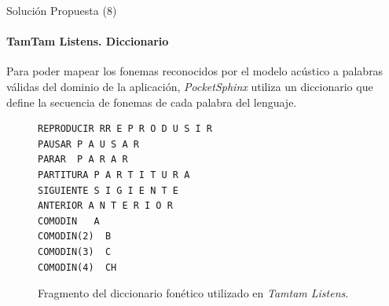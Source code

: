 \begin{frame}[fragile]{Soluci\'on Propuesta (8)}
\framesubtitle{TamTam Listens. Diccionario}
Para poder mapear los fonemas reconocidos por el modelo ac\'ustico a palabras v\'alidas del dominio de la 
aplicaci\'on, \emph{PocketSphinx} utiliza un diccionario que define la secuencia de fonemas de 
cada palabra del lenguaje.

\begin{figure}[H]
\begin{lstlisting}[frame=single]
REPRODUCIR RR E P R O D U S I R
PAUSAR P A U S A R
PARAR  P A R A R
PARTITURA P A R T I T U R A
SIGUIENTE S I G I E N T E
ANTERIOR A N T E R I O R
COMODIN   A
COMODIN(2)  B
COMODIN(3)  C
COMODIN(4)  CH
\end{lstlisting}
\caption{Fragmento del diccionario fon\'etico utilizado en \emph{Tamtam Listens}.}
\label{figure:fragmento-dic}
\end{figure}
\end{frame}
